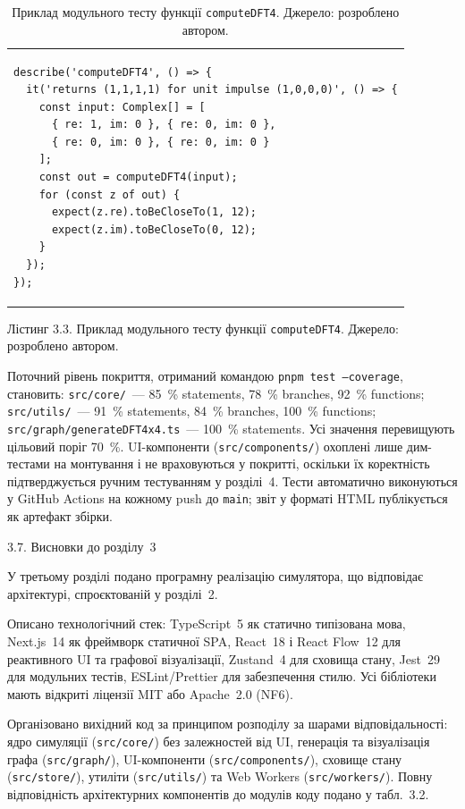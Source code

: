 \begin{longtable}[]{@{}
  >{\raggedright\arraybackslash}p{}@{}}
\caption{Приклад модульного тесту функції \protect\texttt{computeDFT4}.
Джерело: розроблено автором.}\tabularnewline
\toprule\noalign{}
\endfirsthead
\endhead
\bottomrule\noalign{}
\endlastfoot
\begin{minipage}[t]{\linewidth}\raggedright
\begin{verbatim}
describe('computeDFT4', () => {
  it('returns (1,1,1,1) for unit impulse (1,0,0,0)', () => {
    const input: Complex[] = [
      { re: 1, im: 0 }, { re: 0, im: 0 },
      { re: 0, im: 0 }, { re: 0, im: 0 }
    ];
    const out = computeDFT4(input);
    for (const z of out) {
      expect(z.re).toBeCloseTo(1, 12);
      expect(z.im).toBeCloseTo(0, 12);
    }
  });
});
\end{verbatim}
\end{minipage} \\
\end{longtable}

Лістинг 3.3. Приклад модульного тесту функції \texttt{computeDFT4}. Джерело: розроблено автором.

Поточний рівень покриття, отриманий командою \texttt{pnpm test
--coverage}, становить: \texttt{src/core/}~--- 85~\% statements,
78~\% branches, 92~\% functions; \texttt{src/utils/}~--- 91~\%
statements, 84~\% branches, 100~\% functions;
\texttt{src/graph/generateDFT4x4.ts}~--- 100~\% statements. Усі
значення перевищують цільовий поріг 70~\%. UI-компоненти
(\texttt{src/components/}) охоплені лише дим-тестами на монтування і
не враховуються у покритті, оскільки їх коректність підтверджується
ручним тестуванням у розділі~4. Тести автоматично виконуються у GitHub
Actions на кожному push до \texttt{main}; звіт у форматі HTML
публікується як артефакт збірки.

\protect{}\label{_Toc229681163}{}3.7. Висновки до розділу~3

У третьому розділі подано програмну реалізацію симулятора, що відповідає
архітектурі, спроєктованій у розділі~2.

Описано технологічний стек: TypeScript~5 як статично типізована мова,
Next.js~14 як фреймворк статичної SPA, React~18 і React Flow~12 для
реактивного UI та графової візуалізації, Zustand~4 для сховища стану,
Jest~29 для модульних тестів, ESLint/Prettier для забезпечення стилю.
Усі бібліотеки мають відкриті ліцензії MIT або Apache~2.0 (NF6).

Організовано вихідний код за принципом розподілу за шарами
відповідальності: ядро симуляції (\texttt{src/core/}) без залежностей від
UI, генерація та візуалізація графа (\texttt{src/graph/}),
UI-компоненти (\texttt{src/components/}), сховище стану
(\texttt{src/store/}), утиліти (\texttt{src/utils/}) та Web Workers
(\texttt{src/workers/}). Повну відповідність архітектурних компонентів
до модулів коду подано у табл.~3.2.

